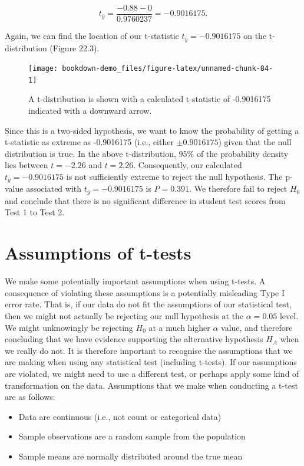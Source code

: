 \documentclass[
  openany]{krantz}
\providecommand{\tightlist}{%
  \setlength{\itemsep}{0pt}\setlength{\parskip}{0pt}}
\begin{document}
\[t_{\bar{y}} = \frac{-0.88 - 0}{0.9760237} = -0.9016175.\]

Again, we can find the location of our t-statistic \(t_{\bar{y}} = -0.9016175\) on the t-distribution (Figure 22.3).

\begin{figure}
\texttt{[image: bookdown-demo\_files/figure-latex/unnamed-chunk-84-1]} \caption{A t-distribution is shown with a calculated t-statistic of -0.9016175 indicated with a downward arrow.}\label{fig:unnamed-chunk-84}
\end{figure}

Since this is a two-sided hypothesis, we want to know the probability of getting a t-statistic as extreme as -0.9016175 (i.e., either \(\pm 0.9016175\)) given that the null distribution is true.
In the above t-distribution, 95\% of the probability density lies between \(t = -2.26\) and \(t = 2.26\).
Consequently, our calculated \(t_{\bar{y}} = -0.9016175\) is not sufficiently extreme to reject the null hypothesis.
The p-value associated with \(t_{\bar{y}} = -0.9016175\) is \(P = 0.391\).
We therefore fail to reject \(H_{0}\) and conclude that there is no significant difference in student test scores from Test 1 to Test 2.

\hypertarget{assumptions-of-t-tests}{%
\section{Assumptions of t-tests}\label{assumptions-of-t-tests}}

We make some potentially important assumptions when using t-tests.
A consequence of violating these assumptions is a potentially misleading Type I error rate.
That is, if our data do not fit the assumptions of our statistical test, then we might not actually be rejecting our null hypothesis at the \(\alpha = 0.05\) level.
We might unknowingly be rejecting \(H_{0}\) at a much higher \(\alpha\) value, and therefore concluding that we have evidence supporting the alternative hypothesis \(H_{A}\) when we really do not.
It is therefore important to recognise the assumptions that we are making when using any statistical test (including t-tests).
If our assumptions are violated, we might need to use a different test, or perhaps apply some kind of transformation on the data.
Assumptions that we make when conducting a t-test are as follows:

\begin{itemize}
\tightlist
\item
  Data are continuous (i.e., not count or categorical data)
\item
  Sample observations are a random sample from the population
\item
  Sample means are normally distributed around the true mean
\end{itemize}
\end{document}

